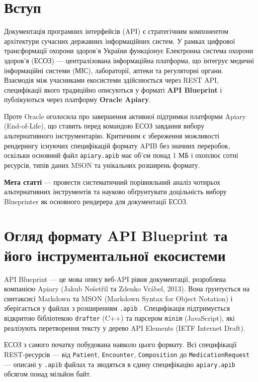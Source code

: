\documentclass{article}
\begin{document}
\tableofcontents

\section{Вступ}
Документація програмних інтерфейсів (API) є стратегічним компонентом архітектури сучасних державних інформаційних систем. У рамках цифрової трансформації охорони здоров'я України функціонує Електронна система охорони здоров'я (ЕСОЗ) — централізована інформаційна платформа, що інтегрує медичні інформаційні системи (МІС), лабораторії, аптеки та регуляторні органи. Взаємодія між учасниками екосистеми здійснюється через REST API, специфікації якого традиційно описуються у форматі \textbf{API Blueprint} і публікуються через платформу \textbf{Oracle Apiary}.

Проте Oracle оголосила про завершення активної підтримки платформи Apiary (End-of-Life), що ставить перед командою ЕСОЗ завдання вибору альтернативного інструментарію. Критичним є збереження можливості рендерингу існуючих специфікацій формату APIB без значних переробок, оскільки основний файл \texttt{apiary.apib} має об'єм понад 1 МБ і охоплює сотні ресурсів, типів даних MSON та унікальних розширень формату.

\textbf{Мета статті} — провести систематичний порівняльний аналіз чотирьох альтернативних інструментів та науково обґрунтувати доцільність вибору Blueprinter як основного рендерера для документації ЕСОЗ.

\section{Огляд формату API Blueprint та його інструментальної екосистеми}
API Blueprint — це мова опису веб-API рівня документації, розроблена компанією Apiary (Jakub Nešetřil та Zdenko Vrábel, 2013). Вона ґрунтується на синтаксисі Markdown та MSON (Markdown Syntax for Object Notation) і зберігається у файлах з розширенням \texttt{.apib} \cite{apiblueprint_spec}. Специфікація підтримується відкритою бібліотекою \texttt{drafter} (C++) та парсером \texttt{minim} (JavaScript), які реалізують перетворення тексту у дерево API Elements (IETF Internet Draft).

ЕСОЗ з самого початку побудована навколо цього формату. Всі специфікації REST-ресурсів — від \texttt{Patient}, \texttt{Encounter}, \texttt{Composition} до \texttt{MedicationRequest} — описані у \texttt{.apib} файлах та зводяться в єдину специфікацію \texttt{apiary.apib} обсягом понад мільйон байт.
\end{document}
